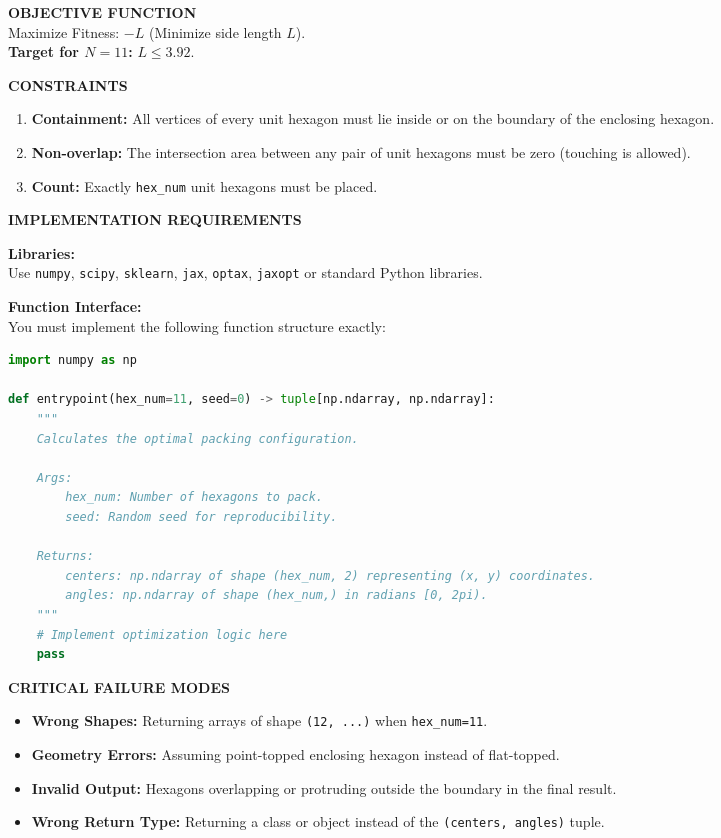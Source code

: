 \documentclass[sigconf]{acmart}
\begin{document}
\begin{paracol}{2}
\noindent \textbf{OBJECTIVE FUNCTION}\\
Maximize Fitness: $-L$ (Minimize side length $L$).\\
\textbf{Target for $N=11$:} $L \le 3.92$.

\vspace{0.3cm}
\noindent \textbf{CONSTRAINTS}
\begin{enumerate}
    \item \textbf{Containment:} All vertices of every unit hexagon must lie inside or on the boundary of the enclosing hexagon.
    \item \textbf{Non-overlap:} The intersection area between any pair of unit hexagons must be zero (touching is allowed).
    \item \textbf{Count:} Exactly \texttt{hex\_num} unit hexagons must be placed.
\end{enumerate}

\vspace{0.3cm}
\noindent \textbf{IMPLEMENTATION REQUIREMENTS}

\noindent \textbf{Libraries:}\\
Use \texttt{numpy}, \texttt{scipy}, \texttt{sklearn}, \texttt{jax}, \texttt{optax}, \texttt{jaxopt} or standard Python libraries.

\noindent \textbf{Function Interface:}\\
You must implement the following function structure exactly:

\begin{lstlisting}[language=Python, frame=single, basicstyle=\ttfamily\scriptsize]
import numpy as np

def entrypoint(hex_num=11, seed=0) -> tuple[np.ndarray, np.ndarray]:
    """
    Calculates the optimal packing configuration.
    
    Args:
        hex_num: Number of hexagons to pack.
        seed: Random seed for reproducibility.

    Returns:
        centers: np.ndarray of shape (hex_num, 2) representing (x, y) coordinates.
        angles: np.ndarray of shape (hex_num,) in radians [0, 2pi).
    """
    # Implement optimization logic here
    pass
\end{lstlisting}

\noindent \textbf{CRITICAL FAILURE MODES}
\begin{itemize}
    \item \textbf{Wrong Shapes:} Returning arrays of shape \texttt{(12, ...)} when \texttt{hex\_num=11}.
    \item \textbf{Geometry Errors:} Assuming point-topped enclosing hexagon instead of flat-topped.
    \item \textbf{Invalid Output:} Hexagons overlapping or protruding outside the boundary in the final result.
    \item \textbf{Wrong Return Type:} Returning a class or object instead of the \texttt{(centers, angles)} tuple.
\end{itemize}


\end{paracol}
\end{document}
